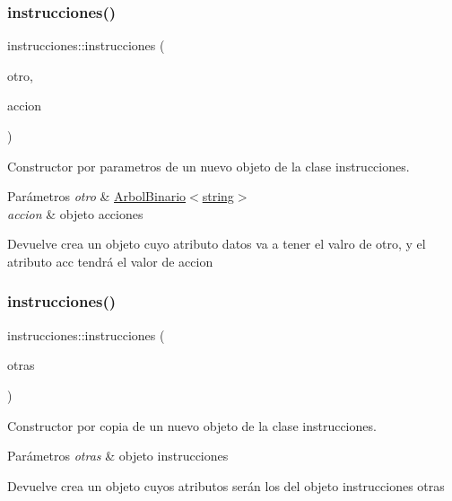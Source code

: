 \subsubsection{\texorpdfstring{instrucciones()}{instrucciones()}\hspace{0.1cm}{\footnotesize\ttfamily [2/3]}}
{\footnotesize\ttfamily instrucciones\+::instrucciones (\begin{DoxyParamCaption}\item[{const \hyperlink{classArbolBinario}{Arbol\+Binario}$<$ string $>$ \&}]{otro,  }\item[{const \hyperlink{classacciones}{acciones} \&}]{accion }\end{DoxyParamCaption})}



Constructor por parametros de un nuevo objeto de la clase instrucciones. 


\begin{DoxyParams}{Parámetros}
{\em otro} & \hyperlink{classArbolBinario}{Arbol\+Binario$<$string$>$} \\
\hline
{\em accion} & objeto acciones \\
\hline
\end{DoxyParams}
\begin{DoxyReturn}{Devuelve}
crea un objeto cuyo atributo datos va a tener el valro de otro, y el atributo acc tendrá el valor de accion 
\end{DoxyReturn}
\mbox{\label{classinstrucciones_a2da9218bb77463a550bfb25bc1eeb89c}} 
\subsubsection{\texorpdfstring{instrucciones()}{instrucciones()}\hspace{0.1cm}{\footnotesize\ttfamily [3/3]}}
{\footnotesize\ttfamily instrucciones\+::instrucciones (\begin{DoxyParamCaption}\item[{const \hyperlink{classinstrucciones}{instrucciones} \&}]{otras }\end{DoxyParamCaption})}



Constructor por copia de un nuevo objeto de la clase instrucciones. 


\begin{DoxyParams}{Parámetros}
{\em otras} & objeto instrucciones \\
\hline
\end{DoxyParams}
\begin{DoxyReturn}{Devuelve}
crea un objeto cuyos atributos serán los del objeto instrucciones otras 
\end{DoxyReturn}
\mbox{\label{classinstrucciones_ae4edada50c41e03502a09052b41a8c71}} 
